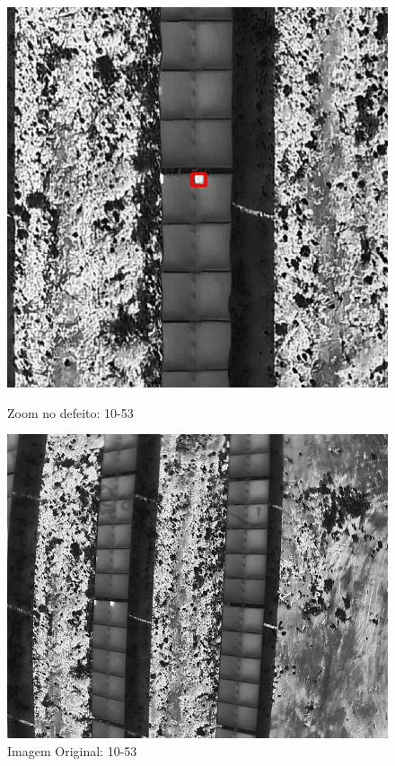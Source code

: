 \documentclass[dvipsnames]{article}%
\begin{document}
\begin{figure}[h!]
\begin{minipage}{0.31\linewidth}
\centering%
\centering%
\includegraphics[width=\linewidth]{report_images/hotspots_10-53_cropped.jpg}%
\caption{Zoom no defeito: 10-53}%
\end{minipage}%
\hfill%
\begin{minipage}{0.31\linewidth}%
\centering%
\centering%
\includegraphics[width=\linewidth]{report_images/hotspots_10-53.jpg}%
\caption{Imagem Original: 10-53}%
\end{minipage}%
\end{figure}
\end{document}
